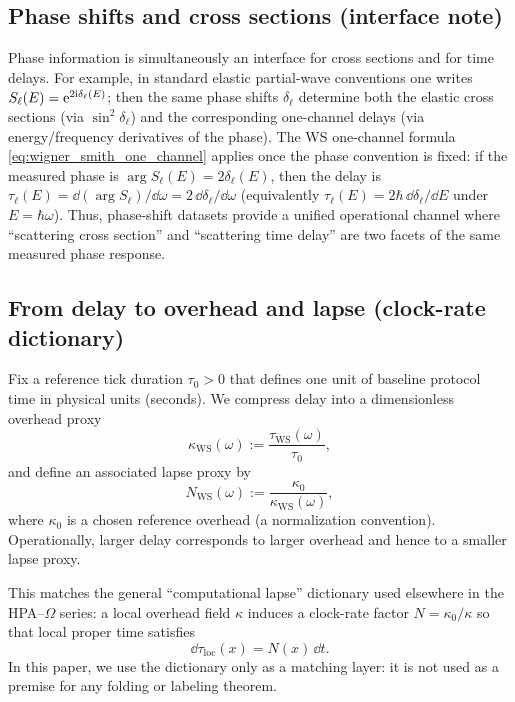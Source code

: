\subsection{Phase shifts and cross sections (interface note)}
\label{subsec:phase_shifts_cross_sections_interface}

\InterfaceTag Phase information is simultaneously an interface for cross sections and for time delays.
For example, in standard elastic partial-wave conventions one writes $S_\ell(E)=\mathrm{e}^{2\mathrm{i}\delta_\ell(E)}$; then the same phase shifts $\delta_\ell$ determine both the elastic cross sections (via $\sin^2\delta_\ell$) and the corresponding one-channel delays (via energy/frequency derivatives of the phase).
The WS one-channel formula \eqref{eq:wigner_smith_one_channel} applies once the phase convention is fixed: if the measured phase is $\arg S_\ell(E)=2\delta_\ell(E)$, then the delay is $\tau_\ell(E)=\dd(\arg S_\ell)/\dd\omega=2\,\dd\delta_\ell/\dd\omega$ (equivalently $\tau_\ell(E)=2\hbar\,\dd\delta_\ell/\dd E$ under $E=\hbar\omega$).
Thus, phase-shift datasets provide a unified operational channel where ``scattering cross section'' and ``scattering time delay'' are two facets of the same measured phase response.

\subsection{From delay to overhead and lapse (clock-rate dictionary)}
\label{app:delay_to_lapse_dictionary}

Fix a reference tick duration $\tau_0>0$ that defines one unit of baseline protocol time in physical units (seconds).
We compress delay into a dimensionless overhead proxy
\begin{equation}
\label{eq:kappa_ws_def}
\kappa_{\mathrm{WS}}(\omega):=\frac{\tau_{\mathrm{WS}}(\omega)}{\tau_0},
\end{equation}
and define an associated lapse proxy by
\begin{equation}
\label{eq:lapse_ws_def}
N_{\mathrm{WS}}(\omega):=\frac{\kappa_0}{\kappa_{\mathrm{WS}}(\omega)},
\end{equation}
where $\kappa_0$ is a chosen reference overhead (a normalization convention).
Operationally, larger delay corresponds to larger overhead and hence to a smaller lapse proxy.

This matches the general ``computational lapse'' dictionary used elsewhere in the HPA--$\Omega$ series: a local overhead field $\kappa$ induces a clock-rate factor $N=\kappa_0/\kappa$ so that local proper time satisfies
\begin{equation}
\label{eq:dtau_lapse_dictionary}
\dd\tau_{\mathrm{loc}}(x)=N(x)\,\dd t.
\end{equation}
In this paper, we use the dictionary only as a matching layer: it is not used as a premise for any folding or labeling theorem.

